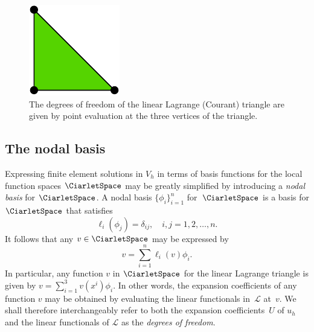 \begin{figure}
  \center\includegraphics[width=\smallfig]{chapters/kirby-7/pdf/P1.pdf}
  \caption{The degrees of freedom of the linear Lagrange (Courant)
    triangle are given by point evaluation at the three vertices of
    the triangle.}
  \label{fig:P1}
\end{figure}

\subsection{The nodal basis}

Expressing finite element solutions in $V_h$ in terms of basis
functions for the local function spaces $\CiarletSpace$ may be greatly
simplified by introducing a \emph{nodal basis} for $\CiarletSpace$.  A
nodal basis $\{\phi_i\}_{i=1}^{n}$ for~$\CiarletSpace$ is a basis for
$\CiarletSpace$ that satisfies
\begin{equation} \label{eq:nodalbasis}
  \ell_i(\phi_j) = \delta_{ij}, \quad i, j = 1,2,\ldots, n.
\end{equation}
It follows that any $v \in \CiarletSpace$ may be expressed by
\begin{equation}
  v = \sum_{i=1}^{n} \ell_i(v) \phi_i.
\end{equation}
In particular, any function $v$ in $\CiarletSpace$ for the linear
Lagrange triangle is given by $v = \sum_{i=1}^3 v(x^i) \phi_i$. In
other words, the expansion coefficients of any function $v$ may be
obtained by evaluating the linear functionals in~$\mathcal{L}$
at~$v$. We shall therefore interchangeably refer to both the expansion
coefficients~$U$ of $u_h$ and the linear functionals of $\mathcal{L}$
as the \emph{degrees of freedom}.

